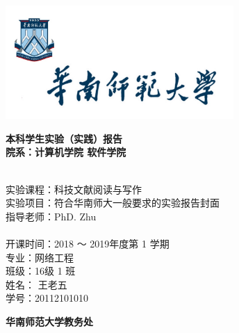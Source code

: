 \documentclass[10.5pt,a4paper,headings]{ctexart}
\newcommand{\titleline}[1]{\hspace*{6em} #1 \\}
\begin{document}
\begin{titlepage}
\scshape


\begin{center}
\vspace*{0.6cm}
\includegraphics[width=0.65\textwidth]{./logo.jpg}

\doublespacing
\fontsize{18pt}{2em}\bf
本科学生实验（实践）报告\\
\vspace{1em}
院系：计算机学院
\hspace{2ex}
软件学院
\end{center}

\begin{flushleft}

\setlength{\parindent}{2em}
\bf
{\fontsize{14pt}{18pt}

\linespread{1.5}\selectfont
~\\
\titleline{实验课程：科技文献阅读与写作}

\titleline{实验项目：符合华南师大一般要求的实验报告封面}

\titleline{指导老师：PhD. Zhu}
~\\
\titleline{开课时间：2018 ～ 2019年度第 1 学期}

\titleline{专\hspace{2em}业：网络工程}

\titleline{班\hspace{2em}级：16级 1 班}

\titleline{姓\hspace{2em}名： 王老五}

\titleline{学\hspace{2em}号：20112101010}
}
\end{flushleft}

\begin{center}
\vspace{3cm}
\fontsize{14pt}{21pt}
\bf 华南师范大学教务处
\end{center}

\end{titlepage}
\end{document}
